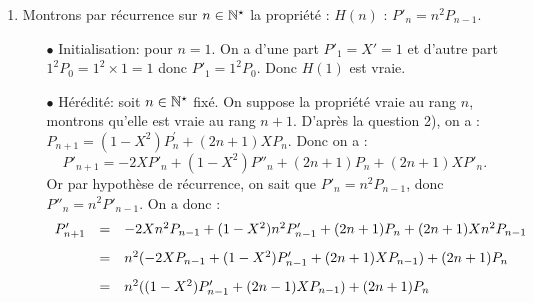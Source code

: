 \documentclass[a4paper, 11pt,reqno]{article}
\begin{document}
\begin{correction}
\begin{enumerate}
\begin{itemize}
			      \item[$\bullet$] H\'er\'edit\'e: soit $n\in\N$ fix\'e. On suppose la propri\'et\'e vraie au rang $n$, montrons qu'elle est vraie au rang $n+1$. Par hypoth\`ese de r\'ecurrence, on sait que $P_{2n}$ est paire et $P_{2n+1}$ est impaire. Donc $P'_{2n}$ est une fonction impaire et  $P'_{2n+1}$ est une fonction paire . De plus, pour tout $x \in I$, d'apr\`es la relation $(R)$ :
			            $$\hspace*{-1cm}P_{2n+2}(-x) = (1-(-x)^2)P'_{2n+1}(x) + (4n+1)(-x)P_{2n+1}(-x) = (1-x^2)P'_{2n+1}(x) + (4n+1) x P_{2n+1}(x) = P_{2n+2}(x)$$
			            car $P_{2n+1}$ est impaire et $P'_{2n+1}$ est paire. De m\^eme :
			            $$\hspace*{-1cm}P_{2n+3}(-x) = (1-(-x)^2)P'_{2n+2}(x) + (4n+3)(-x)P_{2n+2}(-x) = -(1-x^2)P'_{2n+2}(x) - (4n+3) x P_{2n+2}(x) = -P_{2n+3}(x)$$
			            car $P_{2n+2}$ est paire et $P'_{2n+2}$ est impaire.
			            Ainsi, on a $P_{2n+2}$ paire et $P_{2n+3}$ impaire, et $H(n+1)$ est vraie.
		      \end{itemize}
		      Il r\'esulte du principe de r\'ecurrence que, pour tout $n\in\N$, $H(n)$ est vraie.
		\item Montrons par r\'ecurrence sur $n\in \N^\star$ la propri\'et\'e : $H(n)$ : $P'_{n}=n^2P_{n-1}$.
		      \begin{itemize}
			      \item[$\bullet$] Initialisation: pour $n=1$. On a d'une part $P'_1=X'=1$ et d'autre part $1^2 P_0= 1^2 \times 1 =1$  donc $P'_1=1^2 P_0$. Donc $H(1)$ est vraie.
			      \item[$\bullet$] H\'er\'edit\'e: soit $n\in\N^\star$ fix\'e. On suppose la propri\'et\'e vraie au rang $n$, montrons qu'elle est vraie au rang $n+1$. D'apr\`es la question 2), on a : $P_{n+1}=(1-X^2)P_n^{\prime}+(2n+1)XP_n$. Donc on a :
			            $$P'_{n+1} = -2XP'_n + (1-X^2)P''_n +(2n+1)P_n +(2n+1)XP'_n.$$
			            Or par hypoth\`ese de r\'ecurrence, on sait que $P'_{n}=n^2P_{n-1}$, donc $P''_n = n^2 P'_{n-1}$. On a donc :
			            $$\begin{array}{rcll}
					            P'_{n+1} & = & -2X n^2P_{n-1} + (1-X^2)n^2P'_{n-1}+(2n+1)P_n +(2n+1)Xn^2P_{n-1}\vsec            \\
					                     & = & n^2(-2X P_{n-1} + (1-X^2) P'_{n-1}+(2n+1)XP_{n-1}) + (2n+1) P_n\vsec             \\
					                     & = & n^2((1-X^2) P'_{n-1}+(2n-1)XP_{n-1}) + (2n+1) P_n\vsec                           \\

\end{array}$$
\end{itemize}
\end{enumerate}
\end{correction}
\end{document}

